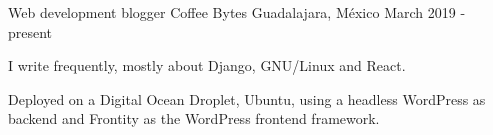 \begin{cventries}
  \cventry
    {Web development blogger}
    {Coffee Bytes}
    {Guadalajara, México}
    {March 2019 - present}
    {
      \begin{cvitems}
        \item {I write frequently, mostly about Django, GNU/Linux and React.}
        \item {Deployed on a Digital Ocean Droplet, Ubuntu, using a headless WordPress as backend and Frontity as the WordPress frontend framework.}
      \end{cvitems}
    }

\end{cventries}

